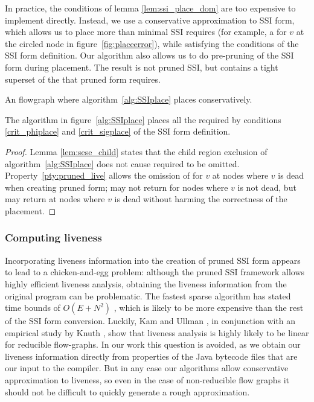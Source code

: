 \documentclass[12pt,titlepage,twoside]{article}
\newcommand*{\figscale}{1.0}
\begin{document}
In practice, the conditions of lemma \ref{lem:ssi_place_dom} are too expensive
to implement directly.  Instead, we use a conservative approximation
to SSI form, which allows us to place more  than
minimal SSI requires (for example, a \phifunction for $v$ at the
circled node in figure~\ref{fig:placeerror}), while satisfying the
conditions of the SSI form definition.  
Our algorithm also allows us to do pre-pruning of the SSI
form during placement.  The result is not pruned SSI, but contains a
tight superset of the  that pruned form requires.
\begin{myfigure}
\centering\renewcommand*{\figscale}{0.30}
\caption{An flowgraph where algorithm~\ref{alg:SSIplace} places
 conservatively.}\label{fig:placeerror}
\end{myfigure}

\begin{theorem}\label{thm:placeproof}
The algorithm in figure~\ref{alg:SSIplace} places all the
 required by conditions \ref{crit_phiplace} and
\ref{crit_sigplace} of the SSI form definition.
\end{theorem}
\begin{proof}
Lemma \ref{lem:sese_child} states that the child region exclusion of
algorithm~\ref{alg:SSIplace} does not cause required  to
be omitted.  Property~\ref{pty:pruned_live} allows the omission of
 for $v$ at nodes where $v$ is dead when creating
pruned form;  may not return  for nodes
where $v$ is not dead, but may return  at nodes where $v$
is dead without harming the correctness of the \phisigfunction{}
placement.
\end{proof}

\subsubsection{Computing liveness}
Incorporating liveness information into the creation of pruned SSI
form appears to lead to a chicken-and-egg problem: although the pruned
SSI framework allows highly efficient liveness analysis, obtaining the
liveness information from the original program can be problematic.
The fastest sparse algorithm has stated time bounds of $O(E+N^2)$
\cite{ferrante91:pruned}, which is likely to be more expensive than
the rest of the SSI form conversion.  Luckily, Kam and Ullman
\cite{kam76:dataflow}, in conjunction with an empirical study by Knuth
\cite{knuth74:fortran}, show that liveness analysis is highly likely
to be linear for reducible flow-graphs.  In our work this question is
avoided, as we obtain our liveness information directly from
properties of the Java bytecode files that are our input to the
compiler.  But in any case our algorithms allow conservative
approximation to liveness, so even in the case of non-reducible flow
graphs it should not be difficult to quickly generate a rough
approximation.
\end{document}
